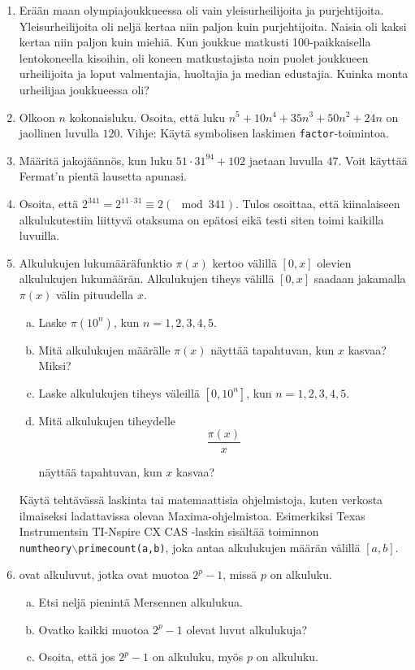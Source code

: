 \begin{enumerate}
\item Erään maan olympiajoukkueessa oli vain yleisurheilijoita ja
purjehtijoita. Yleisurheilijoita oli neljä kertaa niin paljon kuin
purjehtijoita. Naisia oli kaksi kertaa niin paljon kuin miehiä.
Kun joukkue matkusti 100-paikkaisella lentokoneella kisoihin,
oli koneen matkustajista noin puolet joukkueen urheilijoita ja
loput valmentajia, huoltajia ja median edustajia. Kuinka monta
urheilijaa joukkueessa oli?

\item Olkoon $n$ kokonaisluku. Osoita, että luku
$n^5+10n^4+35n^3+50n^2+24n$ on jaollinen luvulla $120$. Vihje:
Käytä symbolisen laskimen {\tt factor}-toimintoa.

\item
Määritä jakojäännös, kun luku $51\cdot 31^{94}+102$ jaetaan
luvulla $47$. Voit käyttää Fermat'n pientä lausetta apunasi.

\item Osoita, että $2^{341} = 2^{11 \cdot 31} \equiv 2 (\mod 341)
$. Tulos osoittaa, että kiinalaiseen alkulukutestiin liittyvä
otaksuma on epätosi eikä testi siten toimi kaikilla luvuilla.

\item
Alkulukujen lukumääräfunktio $\pi(x)$ kertoo välillä $[0, x]$
olevien alkulukujen lukumäärän. Alkulukujen tiheys välillä $[0, x]
$ saadaan jakamalla $\pi(x)$ välin pituudella $x$.
\begin{enumerate}[a)]
\item Laske $\pi(10^n)$, kun $n=1, 2, 3, 4, 5$.
\item Mitä alkulukujen määrälle $\pi(x)$ näyttää tapahtuvan,
kun $x$ kasvaa? Miksi?
\item Laske alkulukujen tiheys väleillä $[0, 10^n]$, kun
$n=1, 2, 3, 4, 5$.
\item Mitä alkulukujen tiheydelle
\[
\frac{\pi(x)}{x}
\]

näyttää tapahtuvan, kun $x$ kasvaa?
\end{enumerate}
Käytä tehtävässä laskinta tai matemaattisia ohjelmistoja, kuten
verkosta ilmaiseksi ladattavissa olevaa Maxima-ohjelmistoa.
Esimerkiksi Texas Instrumentsin TI-Nspire CX CAS -laskin sisältää
toiminnon \\{\tt numtheory$\backslash$primecount(a,b)}, joka antaa
alkulukujen määrän välillä $[a, b]$.

\item {} ovat alkuluvut, jotka ovat
muotoa $2^p - 1$, missä $p$ on alkuluku.
\begin{enumerate}[a)]
\item Etsi neljä pienintä Mersennen alkulukua.
\item Ovatko kaikki muotoa $2^p - 1$ olevat luvut alkulukuja?
\item Osoita, että jos $2^p - 1$ on alkuluku, myös $p$ on
alkuluku.


\end{enumerate}
\end{enumerate}
